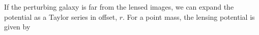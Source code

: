 If the perturbing galaxy is far from the lensed images, we can expand the potential as a Taylor series in offset, $r$. For a point mass, the lensing potential is given by